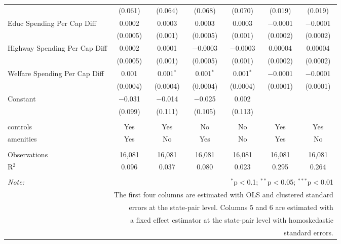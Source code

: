 \begin{table}[!htbp]
\begin{tabular}{@{\extracolsep{5pt}}lcccccc}
  & (0.061) & (0.064) & (0.068) & (0.070) & (0.019) & (0.019) \\ 
  Educ Spending Per Cap Diff & 0.0002 & 0.0003 & 0.0003 & 0.0003 & $-$0.0001 & $-$0.0001 \\ 
  & (0.0005) & (0.001) & (0.0005) & (0.001) & (0.0002) & (0.0002) \\ 
  Highway Spending Per Cap Diff & 0.0002 & 0.0001 & $-$0.0003 & $-$0.0003 & 0.00004 & 0.00004 \\ 
  & (0.0005) & (0.001) & (0.0005) & (0.001) & (0.0002) & (0.0002) \\ 
  Welfare Spending Per Cap Diff & 0.001 & 0.001$^{*}$ & 0.001$^{*}$ & 0.001$^{*}$ & $-$0.0001 & $-$0.0001 \\ 
  & (0.0004) & (0.0004) & (0.0004) & (0.0004) & (0.0001) & (0.0001) \\ 
  Constant & $-$0.031 & $-$0.014 & $-$0.025 & 0.002 &  &  \\ 
  & (0.099) & (0.111) & (0.105) & (0.113) &  &  \\ 
 \hline \\[-1.8ex] 
controls & Yes & Yes & No & No & Yes & Yes \\ 
amenities & Yes & No & Yes & No & Yes & No \\ 
\hline \\[-1.8ex] 
Observations & 16,081 & 16,081 & 16,081 & 16,081 & 16,081 & 16,081 \\ 
R$^{2}$ & 0.096 & 0.037 & 0.080 & 0.023 & 0.295 & 0.264 \\ 
\hline 
\hline \\[-1.8ex] 
\textit{Note:}  & \multicolumn{6}{r}{$^{*}$p$<$0.1; $^{**}$p$<$0.05; $^{***}$p$<$0.01} \\ 
 & \multicolumn{6}{r}{The first four columns are estimated with OLS and clustered standard} \\ 
 & \multicolumn{6}{r}{ errors at the state-pair level. Columns 5 and 6 are estimated with} \\ 
 & \multicolumn{6}{r}{a fixed effect estimator at the state-pair level with homoskedastic} \\ 
 & \multicolumn{6}{r}{standard errors.} \\ 
\end{tabular} 
\end{table} 
